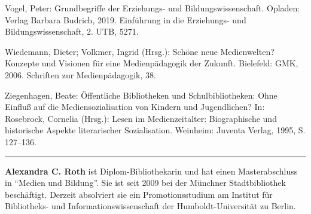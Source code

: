 \documentclass[a4paper,
fontsize=11pt,
oneside,
numbers=noperiodatend,
parskip=half-,
bibliography=totoc,
final
]{scrartcl}
\begin{document}
Vogel, Peter: Grundbegriffe der Erziehungs- und Bildungswissenschaft.
Opladen: Verlag Barbara Budrich, 2019. Einführung in die Erziehungs- und
Bildungswissenschaft, 2. UTB, 5271.

Wiedemann, Dieter; Volkmer, Ingrid (Hrsg.): Schöne neue Medienwelten?
Konzepte und Visionen für eine Medienpädagogik der Zukunft. Bielefeld:
GMK, 2006. Schriften zur Medienpädagogik, 38.

Ziegenhagen, Beate: Öffentliche Bibliotheken und Schulbibliotheken: Ohne
Einfluß auf die Mediensozialisation von Kindern und Jugendlichen? In:
Rosebrock, Cornelia (Hrsg.): Lesen im Medienzeitalter: Biographische und
historische Aspekte literarischer Sozialisation. Weinheim: Juventa
Verlag, 1995, S. 127--136.

\begin{center}\rule{0.5\linewidth}{0.5pt}\end{center}

\textbf{Alexandra C. Roth} ist Diplom-Bibliothekarin und hat einen Masterabschluss in \enquote{Medien und Bildung}. Sie ist seit 2009 bei der Münchner Stadtbibliothek beschäftigt. Derzeit absolviert sie ein Promotionsstudium am Institut für Bibliotheks- und Informationswissenschaft der Humboldt-Universität zu Berlin.
\end{document}

